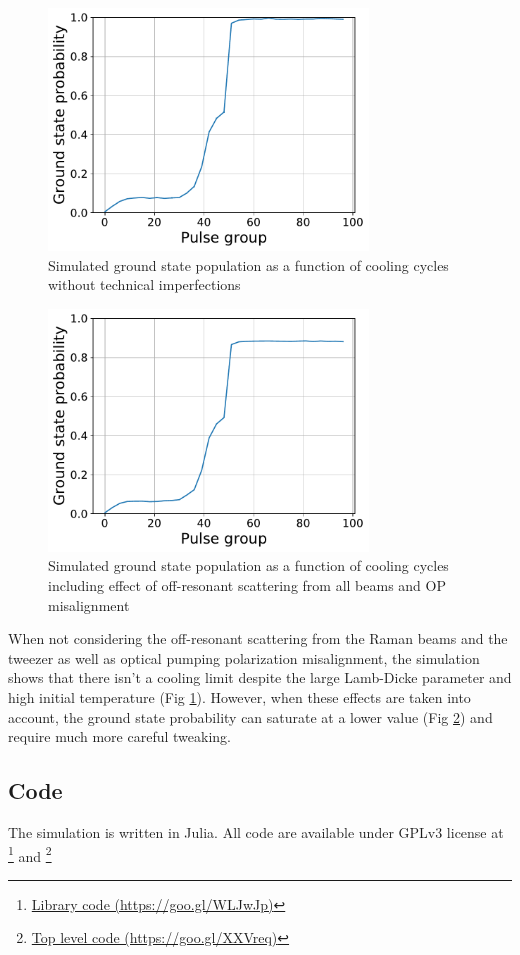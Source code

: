 \documentclass[aps,twocolumn,secnumarabic,balancelastpage,amsmath,amssymb]{revtex4}
\begin{document}
\begin{figure}
  \includegraphics[width=8.5cm]{imgs/simcool_no_scatter.pdf}
  \caption{Simulated ground state population as a function of cooling cycles without
    technical imperfections \label{f-no-scatter}}
\end{figure}

\begin{figure}
  \includegraphics[width=8.5cm]{imgs/simcool_real.pdf}
  \caption{Simulated ground state population as a function of cooling cycles including effect of
    off-resonant scattering from all beams and OP misalignment\label{f-real}}
\end{figure}

When not considering the off-resonant scattering from the Raman beams and the tweezer as well
as optical pumping polarization misalignment, the simulation shows that there isn't a cooling
limit despite the large Lamb-Dicke parameter and high initial temperature (Fig \ref{f-no-scatter}).
However, when these effects are taken into account, the ground state probability can saturate at
a lower value (Fig \ref{f-real}) and require much more careful tweaking.

\subsection{Code}

The simulation is written in Julia. All code are available under GPLv3 license at
\footnote{\href{https://goo.gl/WLJwJp}{Library code (https://goo.gl/WLJwJp)}} and
\footnote{\href{https://goo.gl/XXVreq}{Top level code (https://goo.gl/XXVreq)}}


\end{document}
